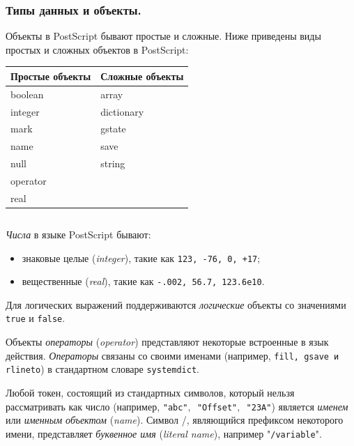 \subsubsection*{Типы данных и объекты.}

Объекты в PostScript бывают простые и сложные. Ниже приведены виды простых и сложных объектов в PostScript:

\begin{center}

\begin{tabular}[t]{|p{12em}|p{12em}|}
\hline
Простые объекты & Сложные объекты\\
\hline
boolean & array\\
integer & dictionary\\
mark & gstate\\
name & save\\
null & string\\
operator & \\
real & \\
\hline
\end{tabular}

\end{center}
$$ $$

\textit{Числа} в языке PostScript бывают:
\begin{itemize}
\item знаковые целые (\textit{integer}), такие как \texttt{123, -76, 0, +17};
\item вещественные (\textit{real}), такие как \texttt{-.002, 56.7, 123.6e10}.
\end{itemize} 

Для логических выражений поддерживаются \textit{логические} объекты со значениями \texttt{true} и \texttt{false}. 

Объекты \textit{операторы} (\textit{operator})  представляют некоторые встроенные в язык действия. \textit{Операторы} связаны со своими именами (например, \texttt{fill, gsave и rlineto}) в стандартном словаре \texttt{systemdict}.


Любой токен, состоящий из стандартных символов, который нельзя рассматривать как число (например, \texttt{"abc"$,$ "Offset"$,$ "23A"}) является \textit{именем} или \textit{именным объектом} (\textit{name}). 
Символ /, являющийся префиксом некоторого имени, представляет \textit{буквенное имя} (\textit{literal name}), например "\texttt{/variable}".

